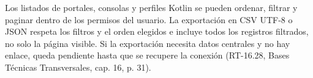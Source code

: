 Los listados de portales, consolas y perfiles Kotlin se pueden ordenar, filtrar y paginar dentro de los permisos del usuario. La exportación en CSV UTF-8 o JSON respeta los filtros y el orden elegidos e incluye todos los registros filtrados, no solo la página visible. Si la exportación necesita datos centrales y no hay enlace, queda pendiente hasta que se recupere la conexión (RT-16.28, Bases Técnicas Transversales, cap. 16, p. 31).

\label{fuente-15-anexo-4-1-n-correspondencia-de-componentes-logicos-fin}
